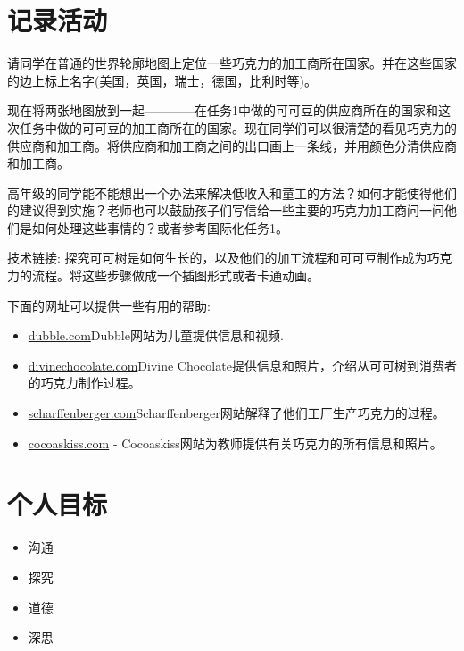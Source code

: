 \section{记录活动}
     请同学在普通的世界轮廓地图上定位一些巧克力的加工商所在国家。并在这些国家的边上标上名字(美国，英国，瑞士，德国，比利时等)。\par
     现在将两张地图放到一起————在任务1中做的可可豆的供应商所在的国家和这次任务中做的可可豆的加工商所在的国家。现在同学们可以很清楚的看见巧克力的供应商和加工商。将供应商和加工商之间的出口画上一条线，并用颜色分清供应商和加工商。\par
     高年级的同学能不能想出一个办法来解决低收入和童工的方法？如何才能使得他们的建议得到实施？老师也可以鼓励孩子们写信给一些主要的巧克力加工商问一问他们是如何处理这些事情的？或者参考国际化任务1。\par
     技术链接: 探究可可树是如何生长的，以及他们的加工流程和可可豆制作成为巧克力的流程。将这些步骤做成一个插图形式或者卡通动画。\par
     下面的网址可以提供一些有用的帮助:\par
     \begin{itemize}
        \item \href{http://www.dubble.co.uk/bean2bar}{dubble.com}Dubble网站为儿童提供信息和视频.
        \item \href{http://www.divinechocolate.com/uk/about-us/research-resources/divine-story/bean-to-bar}{divinechocolate.com}Divine Chocolate提供信息和照片，介绍从可可树到消费者的巧克力制作过程。
        \item \href{http://www.scharffenberger.com/our-story/artisan-process/}{scharffenberger.com}Scharffenberger网站解释了他们工厂生产巧克力的过程。
        \item \href{cocoaskiss.blogspot.com }{cocoaskiss.com} - Cocoaskiss网站为教师提供有关巧克力的所有信息和照片。
     \end{itemize}  
     


\section{个人目标}
    \begin{itemize}
      \item 沟通
      \item 探究
      \item 道德
      \item 深思  
    \end{itemize}  
   
